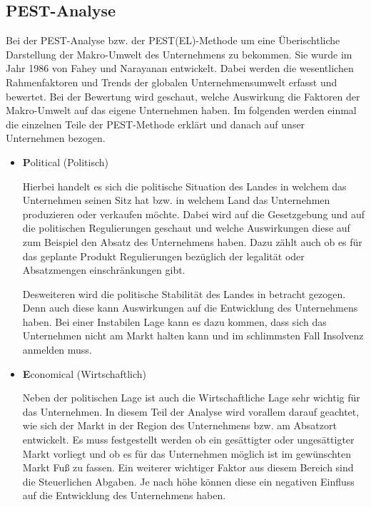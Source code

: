\subsection{PEST-Analyse} \label{pest}
    Bei der PEST-Analyse bzw. der PEST(EL)-Methode um eine Überischtliche Darstellung der Makro-Umwelt des Unternehmens
    zu bekommen. Sie wurde im Jahr 1986 von Fahey und Narayanan entwickelt. Dabei werden die wesentlichen Rahmenfaktoren
    und Trends der globalen Unternehmensumwelt erfasst und 
    bewertet. Bei der Bewertung wird geschaut, welche Auswirkung die Faktoren der Makro-Umwelt auf das eigene 
    Unternehmen haben. Im folgenden werden einmal die einzelnen Teile der PEST-Methode erklärt und danach auf unser 
    Unternehmen bezogen.

        \begin{itemize}
            \item \textbf Political (Politisch)

                Hierbei handelt es sich die politische Situation des Landes in welchem das Unternehmen seinen Sitz hat 
                bzw. in welchem Land das Unternehmen produzieren oder verkaufen möchte. Dabei wird auf die Gesetzgebung 
                und auf die politischen Regulierungen geschaut und welche Auswirkungen diese auf zum Beispiel den Absatz
                des Unternehmens haben. Dazu zählt auch ob es für das geplante Produkt Regulierungen bezüglich der 
                legalität oder Absatzmengen einschränkungen gibt.

                Desweiteren wird die politische Stabilität des Landes in betracht gezogen. Denn auch diese kann 
                Auswirkungen auf die Entwicklung des Unternehmens haben. Bei einer Instabilen Lage kann es dazu kommen,
                dass sich das Unternehmen nicht am Markt halten kann und im schlimmsten Fall Insolvenz anmelden muss.

            \item \textbf Economical (Wirtschaftlich)
            
                Neben der politischen Lage ist auch die Wirtschaftliche Lage sehr wichtig für das Unternehmen. In diesem
                Teil der Analyse wird vorallem darauf geachtet, wie sich der Markt in der Region des Unternehmens bzw. 
                am Absatzort entwickelt. Es muss festgestellt werden ob ein gesättigter oder ungesättigter Markt 
                vorliegt und ob es für das Unternehmen möglich ist im gewünschten Markt Fuß zu fassen. Ein weiterer 
                wichtiger Faktor aus diesem Bereich sind die Steuerlichen Abgaben. Je nach höhe können diese ein 
                negativen Einfluss auf die Entwicklung des Unternehmens haben.


\end{itemize}
